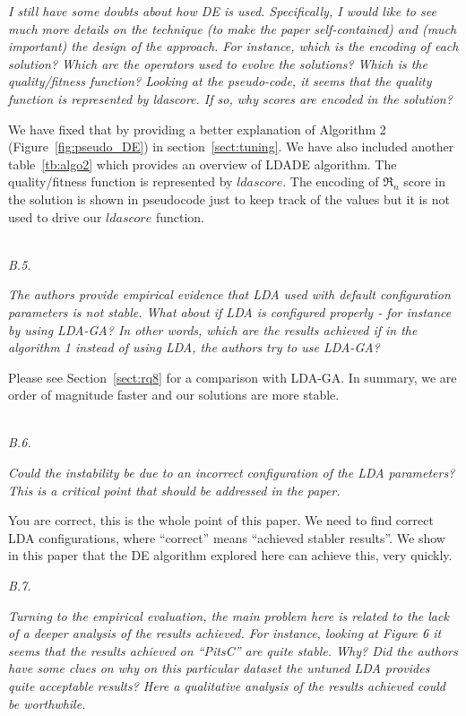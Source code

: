 \documentclass[twocolumn,5p,sort&compress]{elsarticle}
\theoremstyle{break}
\begin{document}
\textit{I still have some doubts about how DE is used. Specifically, I would like to see much more details on the technique (to make the paper self-contained) and (much important) the design of the approach. For instance, which is the encoding of each solution? Which are the operators used to evolve the solutions? Which is the quality/fitness function? Looking at the pseudo-code, it seems that the quality function is represented by ldascore. If so, why scores are encoded in the solution?\\} 

We have fixed that by providing a better explanation of Algorithm 2 (Figure~\ref{fig:pseudo_DE}) in section~\ref{sect:tuning}. We have also included another table~\ref{tb:algo2} which provides an overview of LDADE algorithm. The quality/fitness function is represented by $ldascore$. The encoding of $\Re_n$ score in the solution is shown in pseudocode just to keep track of the values but it is not used to drive our $ldascore$ function. 

\noindent
\textit{\\B.5.}  

\textit{The authors provide empirical evidence that LDA used with default configuration parameters is not stable. What about if LDA is configured properly - for instance by using LDA-GA? In other words, which are the results achieved if in the algorithm 1 instead of using LDA, the authors try to use LDA-GA?\\}

Please see Section~\ref{sect:rq8} for a comparison with LDA-GA. In summary, we are order of magnitude faster and our solutions are more stable.

\noindent
\textit{\\B.6.}  

\textit{Could the instability be due to an incorrect configuration of the LDA parameters? This is a critical point that should be addressed in the paper.\\}

You are correct, this is the  whole point of this paper. We need to find correct LDA configurations, where ``correct'' means ``achieved stabler results''. We show in this paper that the DE algorithm explored here can achieve
this, very quickly.

\newpage
\noindent
\textit{B.7.}   

\textit{Turning to the empirical evaluation, the main problem here is related to the lack of a deeper analysis of the results achieved. For instance, looking at Figure 6 it seems that the results achieved on “PitsC” are quite stable. Why? Did the authors have some clues on why on this particular dataset the untuned LDA provides quite acceptable results? Here a qualitative analysis of the results achieved could be worthwhile.\\}
\end{document}
